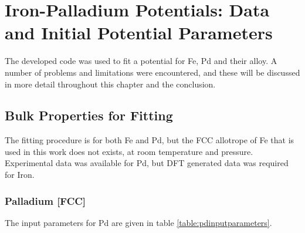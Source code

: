 \FloatBarrier
\section[Fe-Pd Fit Parameters]{Iron-Palladium Potentials: Data and Initial Potential Parameters}

The developed code was used to fit a potential for Fe, Pd and their alloy.  A number of problems and limitations were encountered, and these will be discussed in more detail throughout this chapter and the conclusion.



\subsection{Bulk Properties for Fitting}

The fitting procedure is for both Fe and Pd, but the FCC allotrope of Fe that is used in this work does not exists, at room temperature and pressure.  Experimental data was available for Pd, but DFT generated data was required for Iron. 

\FloatBarrier
\subsubsection{Palladium [FCC]}

The input parameters for Pd are given in table \ref{table:pdinputparameters}. 

